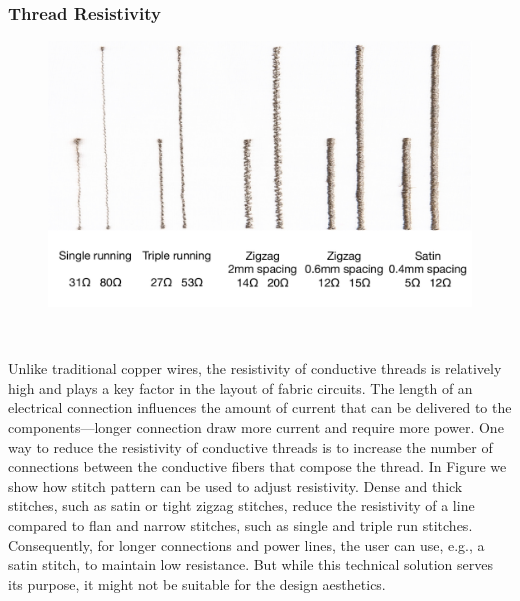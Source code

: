 \subsubsection{Thread Resistivity}
\begin{figure}
\centering
  \includegraphics[width=0.9\columnwidth]{figures/Resistance}
  \caption{}~\label{fig:Resistance}
  \vspace{-2.5em}
\end{figure}
Unlike traditional copper wires, the resistivity of conductive threads is relatively high and plays a key factor in the layout of fabric circuits. The length of an electrical connection influences the amount of current that can be delivered to the components---longer connection draw more current and require more power. One way to reduce the resistivity of conductive threads is to increase the number of connections between the conductive fibers that compose the thread. In Figure we show how stitch pattern can be used to adjust resistivity. Dense and thick stitches, such as satin or tight zigzag stitches, reduce the resistivity of a line compared to flan and narrow stitches, such as single and triple run stitches. Consequently, for longer connections and power lines, the user can use, e.g., a satin stitch, to maintain low resistance. But while this technical solution serves its purpose, it might not be suitable for the design aesthetics.
 

